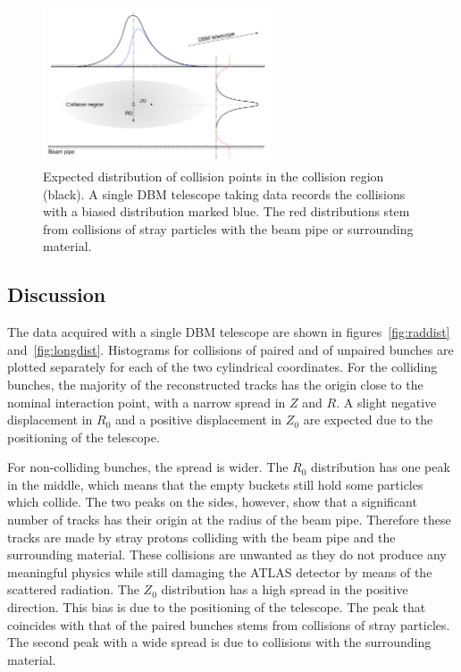 \begin{figure}[!t]
\centering
\includegraphics[width=0.6\textwidth]{04_charge_monitoring/pics/positioningdata}
\caption{Expected distribution of collision points in the collision region (black). A single DBM telescope taking data records the collisions with a biased distribution marked blue. The red distributions stem from collisions of stray particles with the beam pipe or surrounding material.}
\label{fig:positioningdata}
\end{figure}

\subsection{Discussion}
The data acquired with a single DBM telescope are shown in figures~\ref{fig:raddist} and~\ref{fig:longdist}. Histograms for collisions of paired and of unpaired bunches are plotted separately for each of the two cylindrical coordinates. For the colliding bunches, the majority of the reconstructed tracks has the origin close to the nominal interaction point, with a narrow spread in $Z$ and $R$. A slight negative displacement in $R_\mathrm{0}$ and a positive displacement in $Z_\mathrm{0}$ are expected due to the positioning of the telescope.

For non-colliding bunches, the spread is wider. The $R_\mathrm{0}$ distribution has one peak in the middle, which means that the empty buckets still hold some particles which collide. The two peaks on the sides, however, show that a significant number of tracks has their origin at the radius of the beam pipe. Therefore these tracks are made by stray protons colliding with the beam pipe and the surrounding material. These collisions are unwanted as they do not produce any meaningful physics while still damaging the ATLAS detector by means of the scattered radiation. The $Z_\mathrm{0}$ distribution has a high spread in the positive direction. This bias is due to the positioning of the telescope. The peak that coincides with that of the paired bunches stems from collisions of stray particles. The second peak with a wide spread is due to collisions with the surrounding material.

